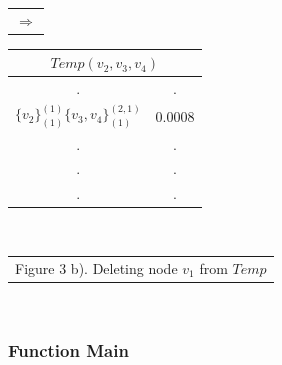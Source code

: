 \documentclass[12pt]{article}
\begin{document}
\begin{table}[!htb]
\begin{minipage}{.06\linewidth}
        \begin{tabular}{c}
     $ \Rightarrow$\\
        \end{tabular}
    \end{minipage}%
    \begin{minipage}{.3\linewidth}
      \centering
     \begin{tabular}{cc}
\multicolumn{2}{c}{$Temp(v_2,v_3,v_4)$}                           \\ \hline
\multicolumn{1}{|c}{.} & \multicolumn{1}{|c|}{.} \\ \hline
  \multicolumn{1}{|l}{$\{v_2\}^{(1)}_{(1)}\{v_3,v_4\}^{(2,1)}_{(1)}$} & \multicolumn{1}{|l|}{$0.0008$} \\ \hline         
                   \multicolumn{1}{|c}{.} & \multicolumn{1}{|c|}{.} \\ \hline                 
                   \multicolumn{1}{|c}{.} & \multicolumn{1}{|c|}{.} \\ \hline
                   \multicolumn{1}{|c}{.} & \multicolumn{1}{|c|}{.} \\ \hline        
\end{tabular}
    \end{minipage}\\
      \begin{minipage}{1.0\linewidth}
       \centering
            \begin{tabular}{c}
Figure 3 b). Deleting node $v_1$ from $Temp$
        \end{tabular}
    \end{minipage}\\
\end{table}

\subsubsection{Function Main}
\end{document}
